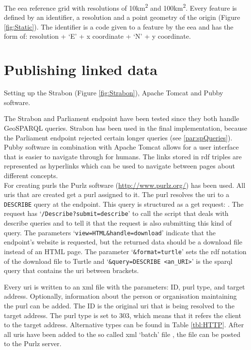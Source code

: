The \ac{eea} reference grid with resolutions of 10km\textsuperscript{2} and 100km\textsuperscript{2}. Every feature is defined by an identifier, a resolution and a point geometry of the origin (Figure \ref{fig:Static}). The identifier is a code given to a feature by the \ac{eea} and has the form of: resolution + `E' + x coordinate + `N' + y coordinate.   

\section{Publishing linked data}
Setting up the Strabon (Figure \ref{fig:Strabon}), Apache Tomcat and Pubby software. 

The Strabon and Parliament endpoint have been tested since they both handle GeoSPARQL queries. Strabon has been used in the final implementation, because the Parliament endpoint rejected certain longer queries (see \ref{par:spQueries}). \\

Pubby software in combination with Apache Tomcat allows for a user interface that is easier to navigate through for humans. The links stored in \ac{rdf} triples are represented as hyperlinks which can be used to navigate between pages about different concepts. \\

For creating \aclp{purl} the Purlz software (\url{http://www.purlz.org/}) has been used. All \acp{uri} that are created get a \ac{purl} assigned to it. The \ac{purl} resolves the \ac{uri} to a \texttt{DESCRIBE} query at the endpoint. This query is structured as a get request: \texttt{}. The request has `\texttt{/Describe?submit=describe}' to call the script that deals with describe queries and to tell it that the request is also submitting this kind of query. The parameters `\texttt{view=HTML\&handle=download}' indicate that the endpoint's website is requested, but the returned data should be a download file instead of an HTML page. The parameter `\texttt{\&format=turtle}' sets the \ac{rdf} notation of the download file to Turtle and `\texttt{\&query=DESCRIBE <an\_URI>}' is the \ac{sparql} query that contains the \ac{uri} between brackets. 

Every \ac{uri} is written to an \ac{xml} file with the parameters: ID, \ac{purl} type, and target address. Optionally, information about the person or organisation maintaining the \ac{purl} can be added. The ID is the original \ac{uri} that is being resolved to the target address. The \ac{purl} type is set to 303, which means that it refers the client to the target address. Alternative types can be found in Table \ref{tbl:HTTP}. After all \acp{uri} have been added to the so called \ac{xml} `batch' file \citep{LD:PURL2}, the file can be posted to the Purlz server. \\

